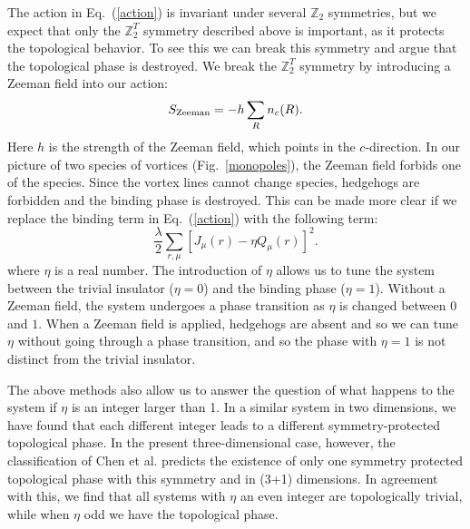 \documentclass[prb,twocolumn]{revtex4-1}
\def\ztwo{\mathbb{Z}_2}
\def\ztwot{\mathbb{Z}_2^T}
\begin{document}

The action in Eq.~(\ref{action}) is invariant under several $\ztwo$ symmetries, but we expect that only the $\ztwot$ symmetry described above is important, as it protects the topological behavior. To see this we can break this symmetry and argue that the topological phase is destroyed.
We break the $\ztwot$ symmetry by introducing a Zeeman field into our action:
\begin{equation}
S_{\rm Zeeman}=-h\sum_R n_c(R).
\label{Zeeman}
\end{equation}
Here $h$ is the strength of the Zeeman field, which points in the $c$-direction. In our picture of two species of vortices (Fig.~\ref{monopoles}), the Zeeman field forbids one of the species. Since the vortex lines cannot change species, hedgehogs are forbidden and the binding phase is destroyed. 
This can be made more clear if we replace the binding term in Eq.~(\ref{action}) with the following term:
\begin{equation}
\frac{\lambda}{2}\sum_{r,\mu} [ J_\mu(r)- \eta Q_\mu(r)]^2.
\label{tbind}
\end{equation}
where $\eta$ is a real number. The introduction of $\eta$ allows us to tune the system between the trivial insulator ($\eta=0$)  and the binding phase ($\eta=1$). Without a Zeeman field, the system undergoes a phase transition as $\eta$ is changed between $0$ and $1$. When a Zeeman field is applied, hedgehogs are absent and so we can tune $\eta$ without going through a phase transition, and so the phase with $\eta=1$ is not distinct from the trivial insulator.

The above methods also allow us to answer the question of what happens to the system if $\eta$ is an integer larger than 1.  In a similar system in two dimensions, we have found that each different integer leads to a different symmetry-protected topological phase.\cite{FQHE} In the present three-dimensional case, however, the classification of Chen et al.\cite{WenScience,*WenPRB} predicts the existence of only one symmetry protected topological phase with this symmetry and in (3+1) dimensions. In agreement with this, we find that all systems with $\eta$ an even integer are topologically trivial, while when $\eta$ odd we have the topological phase. 
\end{document}
